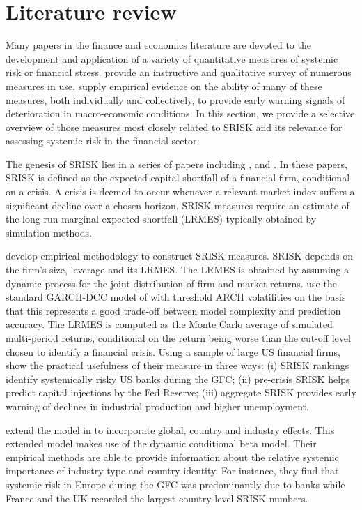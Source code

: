 \documentclass[authoryear]{elsarticle}
\begin{document}
\section{Literature review}\label{litrev}
Many papers in the finance and economics literature are devoted to the development and application of a variety of quantitative measures of systemic risk or financial stress. \cite{Bisias2012} provide an instructive and qualitative survey of numerous measures in use. \cite{Giglio2015} supply empirical evidence on the ability of many of these measures, both individually and collectively, to provide early warning signals of deterioration in macro-economic conditions. In this section, we provide a selective overview of those measures most closely related to SRISK and its relevance for assessing systemic risk in the financial sector. 

The genesis of SRISK lies in a series of papers including \cite{acharya2012aer}, \cite{acharya2012wp} and \cite{brownlees2010volatility}. In these papers, SRISK is defined as the expected capital shortfall of a financial firm, conditional on a crisis. A crisis is deemed to occur whenever a relevant market index suffers a significant decline over a chosen horizon. SRISK measures require an estimate of the long run marginal expected shortfall (LRMES) typically obtained by simulation methods.

\cite{brownlees2015}  develop empirical methodology to construct SRISK measures. SRISK depends on the firm's size, leverage and its LRMES. The LRMES is obtained by assuming a dynamic process for the joint distribution of firm and market returns. \cite{brownlees2015} use  the standard GARCH-DCC model of \cite{engle2002dynamic} with threshold ARCH volatilities on the basis that this represents a good trade-off between model complexity and prediction accuracy. The LRMES is computed as the Monte Carlo average of simulated multi-period returns,  conditional on the return being worse than the cut-off level chosen to identify a financial crisis. Using a sample of large US financial firms,  \cite{brownlees2015} show the practical usefulness of their measure in three ways: (i) SRISK rankings identify systemically risky US banks during the GFC; (ii) pre-crisis SRISK helps predict capital injections by the Fed Reserve; (iii) aggregate SRISK provides early warning of declines in industrial production and higher unemployment.
     
\cite{Engle2015} extend the model in \cite{brownlees2015} to incorporate global, country and industry effects. This extended model makes  use of the \citep{Engle2014dcb} dynamic conditional beta model. Their empirical methods are able to provide information about the relative systemic importance of industry type and country identity. For instance, they find  that systemic risk in Europe during the GFC was predominantly due to banks while France and the UK recorded the largest country-level SRISK numbers. 
\end{document}
